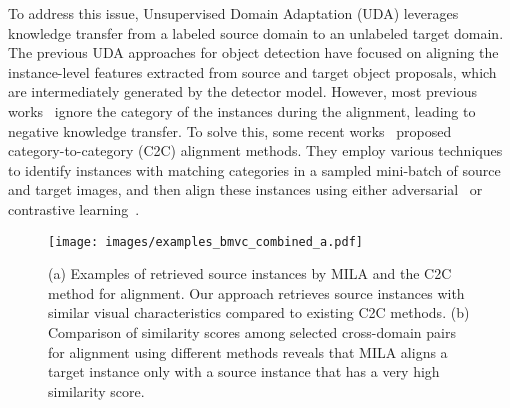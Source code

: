 \documentclass{bmvc2k}
\begin{document}
To address this issue, Unsupervised Domain Adaptation (UDA) leverages knowledge transfer from a labeled source domain to an unlabeled target domain. 
The previous UDA approaches for object detection have focused on aligning the instance-level features extracted from source and target object proposals, which are intermediately generated by the detector model. However, most previous works~\cite{he2019multi, rezaeianaran2021seeking} ignore the category of the instances during the alignment, leading to negative knowledge transfer. 
To solve this, some recent works~\cite{tian2021knowledge, xu2020cross, zhang2021rpn, zheng2020cross} proposed category-to-category (C2C) alignment methods. They employ various techniques to identify instances with matching categories in a sampled mini-batch of source and target images, and then align these instances using either adversarial~\cite{rezaeianaran2021seeking, vs2021mega} or contrastive learning~\cite{zhang2021rpn, xu2020cross, zheng2020cross}. 

\begin{figure*}[t!]
  \texttt{[image: images/examples\_bmvc\_combined\_a.pdf]}
      \caption{(a) Examples of retrieved source instances by MILA and the C2C method for alignment. Our approach retrieves source instances with similar visual characteristics compared to existing C2C methods. (b) Comparison of similarity scores among selected cross-domain pairs for alignment using different methods reveals that MILA aligns a target instance only with a source instance that has a very high similarity score.} \label{fig:fig1}
\end{figure*}
\end{document}
